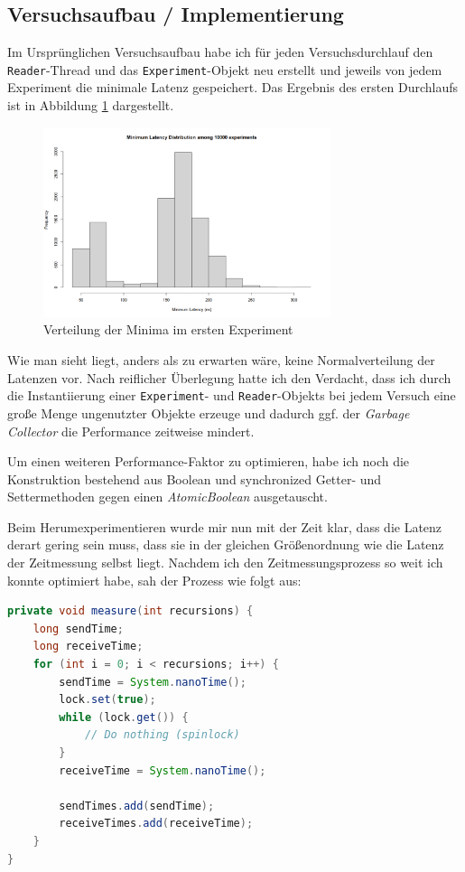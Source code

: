 \documentclass[12pt]{article}
\begin{document}
\subsection{Versuchsaufbau / Implementierung}
Im Ursprünglichen Versuchsaufbau habe ich für jeden Versuchsdurchlauf den \texttt{Reader}-Thread und das \texttt{Experiment}-Objekt neu erstellt und jeweils von jedem Experiment die minimale Latenz gespeichert.
Das Ergebnis des ersten Durchlaufs ist in Abbildung \ref{img:spinlock_first} dargestellt.

\begin{figure}[H]
	\centering
	\includegraphics[width=0.75\textwidth]{./img/spinlock_first_try}
	\caption{Verteilung der Minima im ersten Experiment}
	\label{img:spinlock_first}
\end{figure}

Wie man sieht liegt, anders als zu erwarten wäre, keine Normalverteilung der Latenzen vor.
Nach reiflicher Überlegung hatte ich den Verdacht, dass ich durch die Instantiierung einer \texttt{Experiment}- und \texttt{Reader}-Objekts bei jedem Versuch eine große Menge ungenutzter Objekte erzeuge und dadurch ggf. der \emph{Garbage Collector} die Performance zeitweise mindert.

Um einen weiteren Performance-Faktor zu optimieren, habe ich noch die Konstruktion bestehend aus Boolean und synchronized Getter- und Settermethoden gegen einen \emph{AtomicBoolean} ausgetauscht.

Beim Herumexperimentieren wurde mir nun mit der Zeit klar, dass die Latenz derart gering sein muss, dass sie in der gleichen Größenordnung wie die Latenz der Zeitmessung selbst liegt.
Nachdem ich den Zeitmessungsprozess so weit ich konnte optimiert habe, sah der Prozess wie folgt aus:
\begin{lstlisting}[language=java,caption={Spinlocks: Latenzmessung im Main Thread (optimiert)}]
private void measure(int recursions) {
	long sendTime;
	long receiveTime;
	for (int i = 0; i < recursions; i++) {
		sendTime = System.nanoTime();
		lock.set(true);
		while (lock.get()) {
			// Do nothing (spinlock)
		}
		receiveTime = System.nanoTime();
		
		sendTimes.add(sendTime);
		receiveTimes.add(receiveTime);
	}
}
\end{lstlisting}
\end{document}
